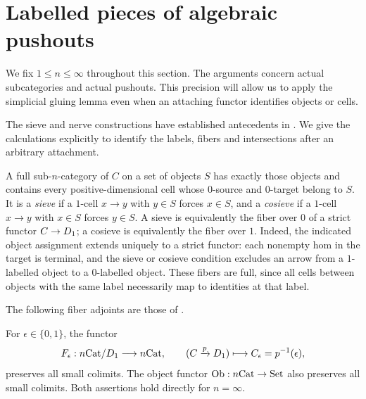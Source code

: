 \section{Labelled pieces of algebraic pushouts}\label{sec:pieces}

We fix $1\leq n\leq\infty$ throughout this section.  The arguments concern
actual subcategories and actual pushouts.  This precision will allow us to
apply the simplicial gluing lemma even when an attaching functor identifies
objects or cells.

The sieve and nerve constructions have established antecedents in
\cite[Propositions~5.3 and~5.5]{AraMaltsiniotis2014}. We give the
calculations explicitly to identify the labels, fibers and intersections
after an arbitrary attachment.

A full sub-$n$-category of $C$ on a set of objects $S$ has exactly those
objects and contains every positive-dimensional cell whose $0$-source
and $0$-target belong to $S$.  It is a \emph{sieve} if a
$1$-cell $x\to y$ with $y\in S$ forces $x\in S$, and a \emph{cosieve} if a
$1$-cell $x\to y$ with $x\in S$ forces $y\in S$.  A sieve is equivalently
the fiber over $0$ of a strict functor $C\to D_{1}$; a cosieve is
equivalently the fiber over $1$.  Indeed, the indicated object assignment
extends uniquely to a strict functor: each nonempty hom in the target is
terminal, and the sieve or cosieve condition excludes an arrow from a
$1$-labelled object to a $0$-labelled object.  These fibers are full, since
all cells between objects with the same label necessarily map to identities
at that label.

The following fiber adjoints are those of
\cite[Lemma~2.8]{AraMaltsiniotis2014}.

\begin{lemma}\label{lem:fibers}
For $\epsilon\in\{0,1\}$, the functor
\[
 F_\epsilon:n\mathrm{Cat}/D_{1}\longrightarrow n\mathrm{Cat},
 \qquad (C\xrightarrow{p}D_{1})\longmapsto C_\epsilon=p^{-1}(\epsilon),
\]
preserves all small colimits.  The object functor
$\operatorname{Ob}:n\mathrm{Cat}\to\mathrm{Set}$ also preserves all small colimits.
Both assertions hold directly for $n=\infty$.
\end{lemma}

